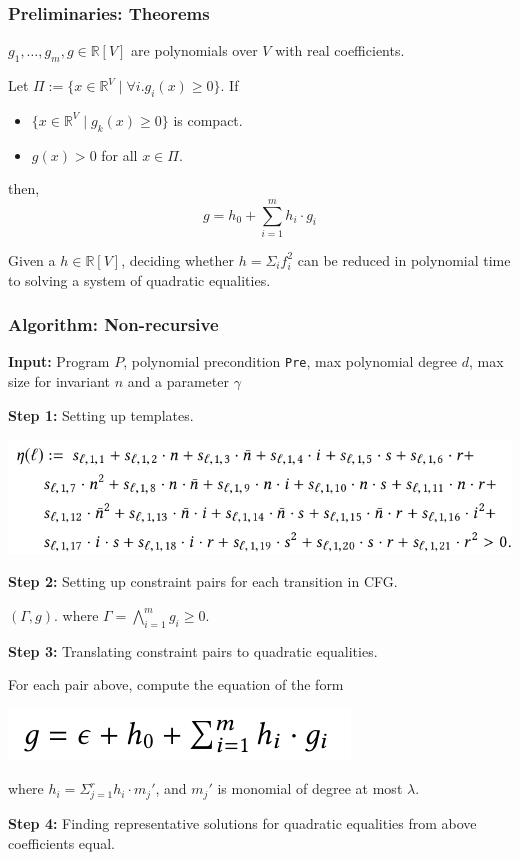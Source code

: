 \documentclass[11pt]{beamer}
\begin{document}
\begin{frame}\frametitle{Preliminaries: Theorems}
\begin{theorem}
$g_1, \ldots, g_m, g \in \mathbb{R}[V]$ are polynomials over $V$ with real coefficients. 

 Let $\Pi := \{x\in \mathbb{R}^{V}\mid \forall i. g_i(x) \ge 0\}$.
 If 
 \begin{itemize}
 \item  $\{x\in \mathbb{R}^{V}\mid g_k(x) \ge 0\}$ is compact.
 \item $g(x) > 0$ for all $x\in \Pi$.
 \end{itemize}
 then,
 \[g = h_0 + \sum_{i = 1}^m h_i\cdot g_i\]

\end{theorem}

\begin{lemma}
Given a $h\in \mathbb{R}[V]$, deciding whether $h = \Sigma_i f_i^2$ can be reduced in polynomial time to solving a system of quadratic equalities.

\end{lemma}
\end{frame}

\begin{frame}\frametitle{Algorithm: Non-recursive}

\textbf{Input:} Program $P$, polynomial precondition \texttt{Pre}, max polynomial degree $d$, max size for invariant $n$ and a parameter $\gamma$

\textbf{Step 1:} Setting up templates.
\begin{center}
\includegraphics[scale=0.3]{template2.png}
\end{center}
\textbf{Step 2:} Setting up constraint pairs for each transition in CFG.

$(\Gamma, g)$. where $\Gamma = \bigwedge_{i = 1}^m g_i \ge 0$. 


\textbf{Step 3:} Translating constraint pairs to quadratic equalities.

For each pair above, compute the equation of the form
\begin{center}
\includegraphics[scale=0.4]{equation1.png}
\end{center}
where $h_i = \Sigma_{j = 1}^rh_i\cdot m_j'$, and $m_j'$ is monomial of degree at most $\lambda$.

\textbf{Step 4:} Finding representative solutions for quadratic equalities from above coefficients equal.

\end{frame}
\end{document}
